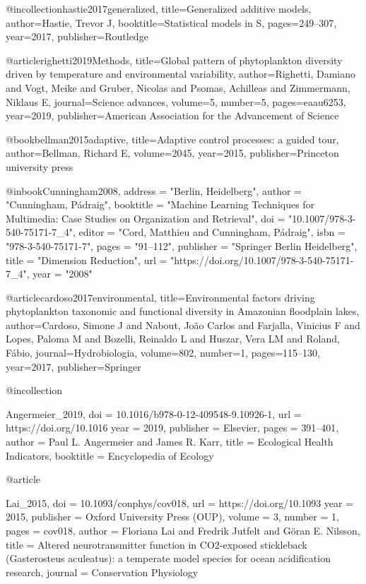 {{{{@incollection{hastie2017generalized,
  title={Generalized additive models},
  author={Hastie, Trevor J},
  booktitle={Statistical models in S},
  pages={249--307},
  year={2017},
  publisher={Routledge}
}

@article{righetti2019Methods,
  title={Global pattern of phytoplankton diversity driven by temperature and environmental variability},
  author={Righetti, Damiano and Vogt, Meike and Gruber, Nicolas and Psomas, Achilleas and Zimmermann, Niklaus E},
  journal={Science advances},
  volume={5},
  number={5},
  pages={eaau6253},
  year={2019},
  publisher={American Association for the Advancement of Science}
}

@book{bellman2015adaptive,
  title={Adaptive control processes: a guided tour},
  author={Bellman, Richard E},
  volume={2045},
  year={2015},
  publisher={Princeton university press}
}


@inbook{Cunningham2008,
	address = "Berlin, Heidelberg",
	author = "Cunningham, Pádraig",
	booktitle = "Machine Learning Techniques for Multimedia: Case Studies on Organization and Retrieval",
	doi = "10.1007/978-3-540-75171-7_4",
	editor = "Cord, Matthieu and Cunningham, Pádraig",
	isbn = "978-3-540-75171-7",
	pages = "91–112",
	publisher = "Springer Berlin Heidelberg",
	title = "Dimension Reduction",
	url = "https://doi.org/10.1007/978-3-540-75171-7_4",
	year = "2008"
}

@article{cardoso2017environmental,
  title={Environmental factors driving phytoplankton taxonomic and functional diversity in Amazonian floodplain lakes},
  author={Cardoso, Simone J and Nabout, Jo{\~a}o Carlos and Farjalla, Vinicius F and Lopes, Paloma M and Bozelli, Reinaldo L and Huszar, Vera LM and Roland, F{\'a}bio},
  journal={Hydrobiologia},
  volume={802},
  number={1},
  pages={115--130},
  year={2017},
  publisher={Springer}
}


@incollection{Angermeier_2019,
	doi = {10.1016/b978-0-12-409548-9.10926-1},
	url = {https://doi.org/10.1016%
	year = 2019,
	publisher = {Elsevier},
	pages = {391--401},
	author = {Paul L. Angermeier and James R. Karr},
	title = {Ecological Health Indicators},
	booktitle = {Encyclopedia of Ecology}
}

@article{Lai_2015,
	doi = {10.1093/conphys/cov018},
	url = {https://doi.org/10.1093%
	year = 2015,
	publisher = {Oxford University Press ({OUP})},
	volume = {3},
	number = {1},
	pages = {cov018},
	author = {Floriana Lai and Fredrik Jutfelt and Göran E. Nilsson},
	title = {Altered neurotransmitter function in {CO}2-exposed stickleback (Gasterosteus aculeatus): a temperate model species for ocean acidification research},
	journal = {Conservation Physiology}
}


}}}}}}
